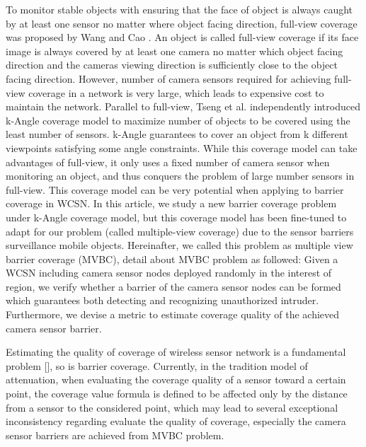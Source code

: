 \documentclass[3p]{elsarticle}
\begin{document}
To monitor stable objects with ensuring that the face of object is always caught by at least one sensor no matter where object facing direction, full-view coverage was proposed by Wang and Cao \cite{wang2013achieving}. An object is called full-view coverage if its face image is always covered by at least one camera no matter which object facing direction and the cameras viewing direction is sufficiently close to the object facing direction.  
However, number of camera sensors required for achieving full-view coverage in a network is very large, which leads to expensive cost to maintain the network. Parallel to full-view, Tseng et al. \cite{tseng2012k} independently introduced k-Angle coverage model to maximize number of objects to be covered using the least number of sensors. k-Angle guarantees to cover an object from k different viewpoints satisfying some angle constraints. While this coverage model can take advantages of full-view, it only uses a fixed number of camera sensor when monitoring an object, and thus conquers the problem of large number sensors in full-view. 
%
This coverage model can be very potential when applying to barrier coverage in WCSN. In this article, we study a new barrier coverage problem under k-Angle coverage model, but this coverage model has been fine-tuned to adapt for our problem (called multiple-view coverage) due to the sensor barriers surveillance mobile objects. Hereinafter, we called this problem as multiple view barrier coverage (MVBC), detail about MVBC problem as followed: Given a WCSN including camera sensor nodes deployed randomly in the interest of region, we verify whether a barrier of the camera sensor nodes can be formed  which guarantees both detecting and recognizing unauthorized intruder. Furthermore, we devise a metric to estimate coverage quality of the achieved camera sensor barrier. \par
%
Estimating the quality of coverage of wireless sensor network is a  fundamental problem [], so is barrier coverage. Currently, in the tradition model of attenuation, when evaluating the coverage quality of a sensor toward a certain point, the coverage value formula is defined to be affected only by the distance from a sensor to the considered point, which may lead to several exceptional inconsistency regarding evaluate the quality of coverage, especially the camera sensor barriers are achieved from MVBC problem. 
\end{document}
